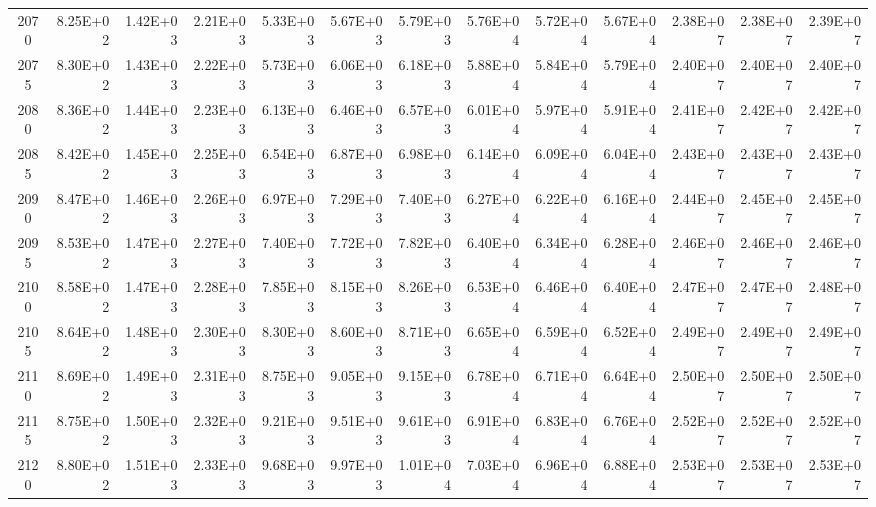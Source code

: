 \documentclass{article}
\begin{document}
\begin{table}
\begin{tabular}{crrr|rrr|rrr|rrr}
2070     & 8.25E+02   & 1.42E+03   & 2.21E+03   & 5.33E+03   & 5.67E+03   & 5.79E+03   & 5.76E+04   & 5.72E+04   & 5.67E+04   & 2.38E+07   & 2.38E+07   & 2.39E+07   \\
2075     & 8.30E+02   & 1.43E+03   & 2.22E+03   & 5.73E+03   & 6.06E+03   & 6.18E+03   & 5.88E+04   & 5.84E+04   & 5.79E+04   & 2.40E+07   & 2.40E+07   & 2.40E+07   \\
2080     & 8.36E+02   & 1.44E+03   & 2.23E+03   & 6.13E+03   & 6.46E+03   & 6.57E+03   & 6.01E+04   & 5.97E+04   & 5.91E+04   & 2.41E+07   & 2.42E+07   & 2.42E+07   \\
2085     & 8.42E+02   & 1.45E+03   & 2.25E+03   & 6.54E+03   & 6.87E+03   & 6.98E+03   & 6.14E+04   & 6.09E+04   & 6.04E+04   & 2.43E+07   & 2.43E+07   & 2.43E+07   \\
2090     & 8.47E+02   & 1.46E+03   & 2.26E+03   & 6.97E+03   & 7.29E+03   & 7.40E+03   & 6.27E+04   & 6.22E+04   & 6.16E+04   & 2.44E+07   & 2.45E+07   & 2.45E+07   \\
2095     & 8.53E+02   & 1.47E+03   & 2.27E+03   & 7.40E+03   & 7.72E+03   & 7.82E+03   & 6.40E+04   & 6.34E+04   & 6.28E+04   & 2.46E+07   & 2.46E+07   & 2.46E+07   \\
2100     & 8.58E+02   & 1.47E+03   & 2.28E+03   & 7.85E+03   & 8.15E+03   & 8.26E+03   & 6.53E+04   & 6.46E+04   & 6.40E+04   & 2.47E+07   & 2.47E+07   & 2.48E+07   \\
2105     & 8.64E+02   & 1.48E+03   & 2.30E+03   & 8.30E+03   & 8.60E+03   & 8.71E+03   & 6.65E+04   & 6.59E+04   & 6.52E+04   & 2.49E+07   & 2.49E+07   & 2.49E+07   \\
2110     & 8.69E+02   & 1.49E+03   & 2.31E+03   & 8.75E+03   & 9.05E+03   & 9.15E+03   & 6.78E+04   & 6.71E+04   & 6.64E+04   & 2.50E+07   & 2.50E+07   & 2.50E+07   \\
2115     & 8.75E+02   & 1.50E+03   & 2.32E+03   & 9.21E+03   & 9.51E+03   & 9.61E+03   & 6.91E+04   & 6.83E+04   & 6.76E+04   & 2.52E+07   & 2.52E+07   & 2.52E+07   \\
2120     & 8.80E+02   & 1.51E+03   & 2.33E+03   & 9.68E+03   & 9.97E+03   & 1.01E+04   & 7.03E+04   & 6.96E+04   & 6.88E+04   & 2.53E+07   & 2.53E+07   & 2.53E+07  
\end{tabular}   \end{table}
\end{document}
